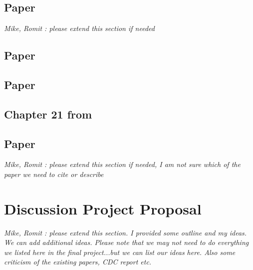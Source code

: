 \documentclass[12pt, journal,onecolumn]{IEEEtran}
\begin{document}
\subsection{Paper \cite{keeling2005networks}}


\bigskip 
{\em{Mike, Romit : please extend this section if needed}}


\subsection{Paper \cite{meltzer2014estimating}}
\subsection{Paper \cite{myers2012information}}
\subsection{Chapter 21 from \cite{easley2010networks}}

\subsection{Paper \cite{newman2002spread}}

\bigskip
{\em{Mike, Romit : please extend this section if needed, I am not sure which of the paper we need to cite or describe}}


\section{Discussion Project Proposal}
\label{sec:ProjectProposal}

\bigskip
{\em{Mike, Romit : please extend this section. I provided some outline and my ideas. We can add additional ideas. Please note that we may not need to do everything we listed here in the final project...but we can list our ideas here. Also some criticism of the existing papers, CDC report etc.}}
\end{document}

